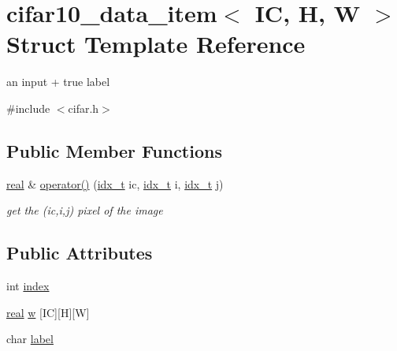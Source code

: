 \hypertarget{structcifar10__data__item}{}\section{cifar10\+\_\+data\+\_\+item$<$ IC, H, W $>$ Struct Template Reference}
\label{structcifar10__data__item}


an input + true label  




{\ttfamily \#include $<$cifar.\+h$>$}

\subsection*{Public Member Functions}
\begin{DoxyCompactItemize}
\item 
\mbox{\label{structcifar10__data__item_af006ac37b8c4ec720da2bb32da85d48e}} 
\hyperlink{vgg__util_8h_a1082d08aaa761215ec83e7149f27ad16}{real} \& \hyperlink{structcifar10__data__item_af006ac37b8c4ec720da2bb32da85d48e}{operator()} (\hyperlink{vgg__util_8h_a8e93478a00e685bea5e6a3f617bf03a3}{idx\+\_\+t} ic, \hyperlink{vgg__util_8h_a8e93478a00e685bea5e6a3f617bf03a3}{idx\+\_\+t} i, \hyperlink{vgg__util_8h_a8e93478a00e685bea5e6a3f617bf03a3}{idx\+\_\+t} j)
\begin{DoxyCompactList}\small\item\em get the (ic,i,j) pixel of the image \end{DoxyCompactList}\end{DoxyCompactItemize}
\subsection*{Public Attributes}
\begin{DoxyCompactItemize}
\item 
int \hyperlink{structcifar10__data__item_a316b080a202c3a6d2dc9d9b573bece65}{index}
\item 
\hyperlink{vgg__util_8h_a1082d08aaa761215ec83e7149f27ad16}{real} \hyperlink{structcifar10__data__item_a8bf2e62adbe5c3005f79fe3fd72d4e71}{w} \mbox{[}IC\mbox{]}\mbox{[}H\mbox{]}\mbox{[}W\mbox{]}
\item 
char \hyperlink{structcifar10__data__item_a90ed5833af38c869823166ea01c58edc}{label}
\end{DoxyCompactItemize}



